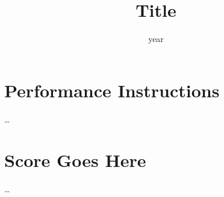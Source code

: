 \documentclass[a3paper, landscape]{score-personal}
\begin{document}
	\title{Title}
	\date{year}

	\maketitle
	\emptypage{}

	\section*{Performance Instructions}
	\dots

	\newpage
	\section*{Score Goes Here}
	\dots
	\emptypage{}
	\finalpage{}
\end{document}

